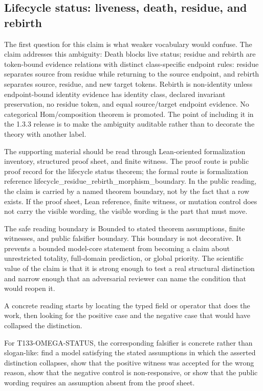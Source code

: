 \subsection{Lifecycle status: liveness, death, residue, and rebirth}
The first question for this claim is what weaker vocabulary would confuse. The claim addresses this ambiguity: Death blocks live status; residue and rebirth are token-bound evidence relations with distinct class-specific endpoint rules: residue separates source from residue while returning to the source endpoint, and rebirth separates source, residue, and new target tokens. Rebirth is non-identity unless endpoint-bound identity evidence has identity class, declared invariant preservation, no residue token, and equal source/target endpoint evidence. No categorical Hom/composition theorem is promoted. The point of including it in the 1.3.3 release is to make the ambiguity auditable rather than to decorate the theory with another label.

The supporting material should be read through Lean-oriented formalization inventory, structured proof sheet, and finite witness. The proof route is public proof record for the lifecycle status theorem; the formal route is formalization reference lifecycle\_residue\_rebirth\_morphism\_boundary. In the public reading, the claim is carried by a named theorem boundary, not by the fact that a row exists. If the proof sheet, Lean reference, finite witness, or mutation control does not carry the visible wording, the visible wording is the part that must move.

The safe reading boundary is Bounded to stated theorem assumptions, finite witnesses, and public falsifier boundary. This boundary is not decorative. It prevents a bounded model-core statement from becoming a claim about unrestricted totality, full-domain prediction, or global priority. The scientific value of the claim is that it is strong enough to test a real structural distinction and narrow enough that an adversarial reviewer can name the condition that would reopen it.

A concrete reading starts by locating the typed field or operator that does the work, then looking for the positive case and the negative case that would have collapsed the distinction.

For T133-OMEGA-STATUS, the corresponding falsifier is concrete rather than slogan-like: find a model satisfying the stated assumptions in which the asserted distinction collapses, show that the positive witness was accepted for the wrong reason, show that the negative control is non-responsive, or show that the public wording requires an assumption absent from the proof sheet.

